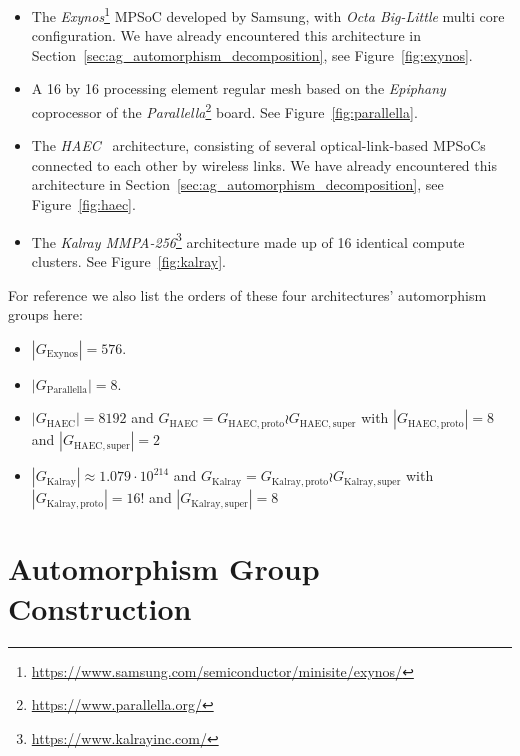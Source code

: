 \begin{itemize}
\item The
\textit{Exynos}\footnote{\hyperlink{https://www.samsung.com/semiconductor/minisite/exynos/}{https://www.samsung.com/semiconductor/minisite/exynos/}}
MPSoC developed by Samsung, with \textit{Octa Big-Little} multi core
configuration. We have already encountered this architecture in
Section~\ref{sec:ag_automorphism_decomposition}, see Figure~\ref{fig:exynos}.

\item A 16 by 16 processing element regular mesh based on the
\textit{Epiphany} \cite{Olofsson} coprocessor of the
\textit{Parallella}\footnote{\hyperlink{https://www.parallella.org/}{https://www.parallella.org/}}
board. See Figure~\ref{fig:parallella}.

\item The \textit{HAEC}~\cite{HAEC} architecture, consisting of several
optical-link-based MPSoCs connected to each other by wireless links. We have
already encountered this architecture in
Section~\ref{sec:ag_automorphism_decomposition}, see Figure~\ref{fig:haec}.

\item The \textit{Kalray
MMPA-256}\footnote{\hyperlink{https://www.kalrayinc.com/}{https://www.kalrayinc.com/}}
architecture made up of 16 identical compute clusters. See
Figure~\ref{fig:kalray}.
\end{itemize}
%
For reference we also list the orders of these four architectures' automorphism
groups here:
%
\begin{itemize}
\item $|G_{\mathrm{Exynos}}| = 576$.

\item $|G_{\mathrm{Parallella}}| = 8$.

\item $|G_{\mathrm{HAEC}}| = 8192$ and $G_{\mathrm{HAEC}} =
G_{\mathrm{HAEC,proto}} \wr G_{\mathrm{HAEC,super}}$ with
$|G_{\mathrm{HAEC,proto}}| = 8$ and $|G_{\mathrm{HAEC,super}}| = 2$

\item $|G_{\mathrm{Kalray}}| \approx 1.079 \cdot 10^{214}$ and
$G_{\mathrm{Kalray}} = G_{\mathrm{Kalray,proto}} \wr G_{\mathrm{Kalray,super}}$
with $|G_{\mathrm{Kalray,proto}}| = 16!$ and $|G_{\mathrm{Kalray,super}}| = 8$
\end{itemize}

\section{Automorphism Group Construction}
\label{sec:exp_automorphism_group_construction}

